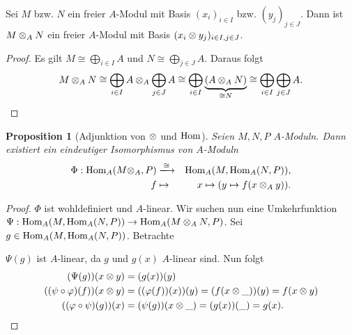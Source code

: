 \documentclass[12pt,a4paper]{scrartcl}
\theoremstyle{cplain}
\newtheorem{prop}[thmcounter]{Proposition}
\theoremstyle{cdef}
\begin{document}
\begin{kor}
	Sei $M$ bzw. $N$ ein freier $A$-Modul mit Basis $(x_i)_{i \in I}$ bzw. $(y_j)_{j\in J}$. Dann ist $M \otimes_A N$ ein freier $A$-Modul mit Basis $(x_i\otimes y_j)_{i \in I, j\in J}$.
\end{kor}
\begin{proof}
	Es gilt $M \cong \bigoplus\limits_{i\in I} A$ und $N \cong \bigoplus\limits_{j\in J} A$. Daraus folgt \[ M \otimes_A N \cong  \bigoplus_{i\in I} A \otimes_A \bigoplus_{j\in J} A \cong \bigoplus_{i \in I}\underbrace{(A \otimes_A N)}_{\cong N} \cong \bigoplus_{i\in I}\bigoplus_{j\in J}A. \qedhere \]
\end{proof}
\begin{prop}[Adjunktion von $\otimes$ und $\operatorname{Hom}$]
	Seien $M,N,P$ $A$-Moduln. Dann existiert ein eindeutiger Isomorphismus von $A$-Moduln
	\begin{eqnarray*}
		\Phi: \Hom_A (M \tp_A , P ) &\xlongrightarrow{\cong}& \Hom_A(M, \Hom_A(N, P)), \\
		f &\mapsto& x \mapsto (y \mapsto f(x \tp_A y)).
	\end{eqnarray*}
\end{prop}
\begin{proof}
	$\Phi$ ist wohldefiniert und $A$-linear. Wir suchen nun eine Umkehrfunktion $\Psi : \operatorname{Hom}_A(M, \operatorname{Hom}_A(N, P)) \to \operatorname{Hom}_A (M \otimes_A N, P )$. Sei $g \in \operatorname{Hom}_A(M, \operatorname{Hom}_A(N,P))$. Betrachte
	\begin{figure}[H]
		\centering
	\end{figure}
	$\Psi(g)$ ist $A$-linear, da $g$ und $g(x)$ $A$-linear sind. Nun folgt
	\begin{align*}
		(\Psi(g))(x \otimes y) &= (g(x))(y) \\
		((\psi \circ \varphi)(f))(x \otimes y) &= ((\varphi(f))(x))(y) = (f(x \otimes \_))(y) = f(x \otimes y) \\
		((\varphi \circ \psi)(g))(x) &= (\psi(g))(x \otimes \_) = (g(x))(\_) = g(x). \qedhere
	\end{align*}
\end{proof}
\end{document}

